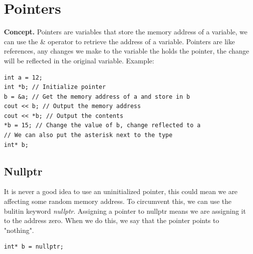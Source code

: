 \documentclass{report}
\begin{document}
    \pagebreak \bigbreak \noindent 
    \section{\LARGE Pointers}
    \bigbreak \noindent 
    \textbf{Concept.} Pointers are variables that store the memory address of a variable, we can use the \& operator to retrieve the address of a variable. Pointers are like references, any changes we make to the variable the holds the pointer, the change will be reflected in the original variable.
    \bigbreak \noindent 
    \bigbreak \noindent 
    Example:
    \bigbreak \noindent 
    \sepline
    \begin{verbatim}
int a = 12;
int *b; // Initialize pointer  
b = &a; // Get the memory address of a and store in b
cout << b; // Output the memory address
cout << *b; // Output the contents
*b = 15; // Change the value of b, change reflected to a
// We can also put the asterisk next to the type
int* b;
    \end{verbatim}
    \sepline

    \bigbreak \noindent 
    \subsection{Nullptr}
    \bigbreak \noindent 
    It is never a good idea to use an uninitialized pointer, this could mean we are affecting some random memory address. To circumvent this, we can use the bulitin keyword \textit{nullptr}. Assigning a pointer to nullptr means we are assigning it to the address zero. When we do this, we say that the pointer points to "nothing".
    \bigbreak \noindent 
    \sepline
    \begin{verbatim}
int* b = nullptr;
    \end{verbatim}
    \sepline
    \bigbreak \noindent 

    \pagebreak\bigbreak \noindent 
\end{document}
